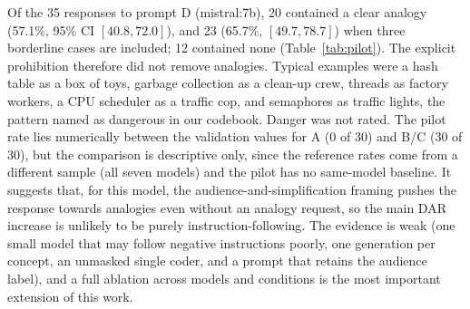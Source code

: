 \documentclass[journal,article,submit,pdftex,moreauthors]{Definitions/mdpi}
\begin{document}
Of the 35 responses to prompt D (mistral:7b), 20 contained a clear analogy (57.1\%, 95\% CI $[40.8, 72.0]$), and 23 (65.7\%, $[49.7, 78.7]$) when three borderline cases are included; 12 contained none (Table~\ref{tab:pilot}). The explicit prohibition therefore did not remove analogies. Typical examples were a hash table as a box of toys, garbage collection as a clean-up crew, threads as factory workers, a CPU scheduler as a traffic cop, and semaphores as traffic lights, the pattern named as dangerous in our codebook. Danger was not rated. The pilot rate lies numerically between the validation values for A (0 of 30) and B/C (30 of 30), but the comparison is descriptive only, since the reference rates come from a different sample (all seven models) and the pilot has no same-model baseline. It suggests that, for this model, the audience-and-simplification framing pushes the response towards analogies even without an analogy request, so the main DAR increase is unlikely to be purely instruction-following. The evidence is weak (one small model that may follow negative instructions poorly, one generation per concept, an unmasked single coder, and a prompt that retains the audience label), and a full ablation across models and conditions is the most important extension of this work.

\begin{table}[H]
\caption{Analogy presence in the pilot ablation (condition D, mistral:7b, one response per concept) and, for reference, in the human-coded validation subsample (30 responses per condition, all seven models). The comparison is descriptive only. Wilson 95\% CIs are shown.}
\label{tab:pilot}
\centering
\footnotesize
{}
\end{table}
\end{document}

